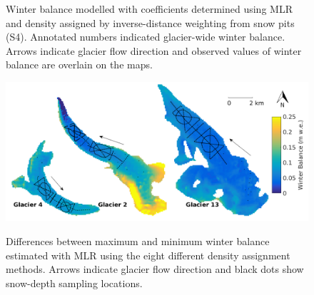 \documentclass{sfuthesis}
\newcommand{\topomap}{Arrows indicate glacier flow direction and black dots show snow-depth sampling locations. }
\newcommand{\swedots}{Arrows indicate glacier flow direction and observed values of winter balance are overlain on the maps. }
\begin{document}
\begin{figure}[H]
	\caption[Winter balance modelled with coefficients determined using MLR and density assigned by inverse-distance weighting from snow pits (S4)]{Winter balance modelled with coefficients determined using MLR and density assigned by inverse-distance weighting from snow pits (S4). Annotated numbers indicated glacier-wide winter balance. \swedots}
	\label{fig:MLRmodelledSWE}
\end{figure}

\begin{figure}[H]
	\centering
	\includegraphics[width =\textwidth]{MLR_SWEdifferenceMap.png}\\
	\caption[Differences between maximum and minimum winter balance estimated with MLR using the eight different density assignment methods]{Differences between maximum and minimum winter balance estimated with MLR using the eight different density assignment methods. \topomap}
	\label{fig:MLR_SWEdiffMap}
\end{figure}
\end{document}

